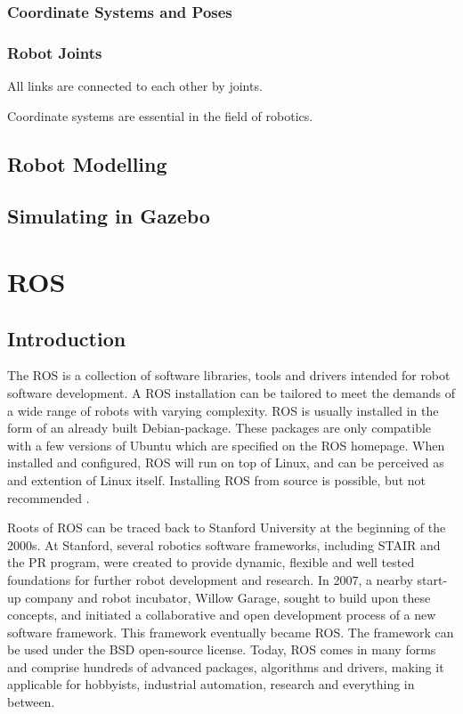 \subsubsection{Coordinate Systems and Poses}

\subsubsection{Robot Joints}

All links are connected to each other by joints. 

Coordinate systems are essential in the field of robotics. 

\subsection{Robot Modelling}

\subsection{Simulating in Gazebo}

\section{ROS}

\subsection{Introduction}

The \ac{ROS} is a collection of software libraries, tools and drivers intended for robot software development. A \ac{ROS} installation can be tailored to meet the demands of a wide range of robots with varying complexity. \ac{ROS} is usually installed in the form of an already built Debian-package. These packages are only compatible with a few versions of Ubuntu which are specified on the \ac{ROS} homepage. When installed and configured, \ac{ROS} will run on top of Linux, and can be perceived as and extention of Linux itself. Installing \ac{ROS} from source is possible, but not recommended \cite{ROS_install}.

Roots of \ac{ROS} can be traced back to Stanford University at the beginning of the 2000s. At Stanford, several robotics software frameworks, including \ac{STAIR} and the \ac{PR} program, were created to provide dynamic, flexible and well tested foundations for further robot development and research. In 2007, a nearby start-up company and robot incubator, Willow Garage, sought to build upon these concepts, and initiated a collaborative and open development process of a new software framework. This framework eventually became \ac{ROS}\cite{ROS_history}\cite{rosbook15}. The framework can be used under the BSD open-source license\cite{BCD_license}. Today, \ac{ROS} comes in many forms and comprise hundreds of advanced packages, algorithms and drivers, making it applicable for hobbyists, industrial automation, research and everything in between. 

